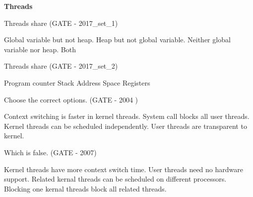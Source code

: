 \centerline{\textbf{ \LARGE Threads}}

\setcounter{question}{0}



\begin{minipage}{\linewidth}

  \question  Threads share (GATE - 2017\_set\_1)

  \begin{choices}
    \choice Global variable but not heap.
    \choice Heap but not global variable.
    \choice Neither global variable nor heap.
    \choice Both
  \end{choices}


\end{minipage}



\begin{minipage}{\linewidth}

  \question  Threads share (GATE - 2017\_set\_2)
    \begin{choices}
      \choice Program counter
      \choice Stack
      \choice Address Space
      \choice Registers
    \end{choices}


\end{minipage}



\begin{minipage}{\linewidth}

  \question Choose the correct options. (GATE - 2004 )

  \begin{choices}
    \choice Context switching is faster in kernel threads.
    \choice System call blocks all user threads.
    \choice Kernel threads can be scheduled independently.
    \choice User threads are transparent to kernel.
  \end{choices}


\end{minipage}



\begin{minipage}{\linewidth}

  \question Which is false. (GATE -  2007)

  \begin{choices}
    \choice Kernel threads have more context switch time.
    \choice User threads need no hardware support.
    \choice Related kernal threads can be scheduled on different processors.
    \choice Blocking one kernal threads block all related threads.
  \end{choices}


\end{minipage}

